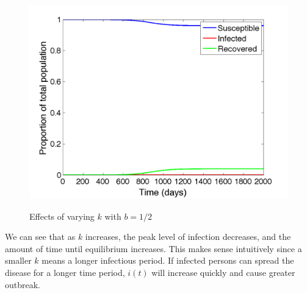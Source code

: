\documentclass{article}
\begin{document}
\begin{figure}[h!]
\begin{minipage}{.32\textwidth}
  \label{fig:k3days}
\end{minipage}
\begin{minipage}{.32\textwidth}
    \centering
    \includegraphics[width=\linewidth]{b05k049}
    \label{fig:k2days}
\end{minipage}
\caption{Effects of varying $k$ with $b=1/2$}
\label{varyingk}
\end{figure}
We can see that as $k$ increases, the peak level of infection decreases, and the amount of time until equilibrium increases.  This makes sense intuitively since a smaller $k$ means a longer infectious period.  If infected persons can spread the disease for a longer time period, $i(t)$ will increase quickly and cause greater outbreak.  
\end{document}
